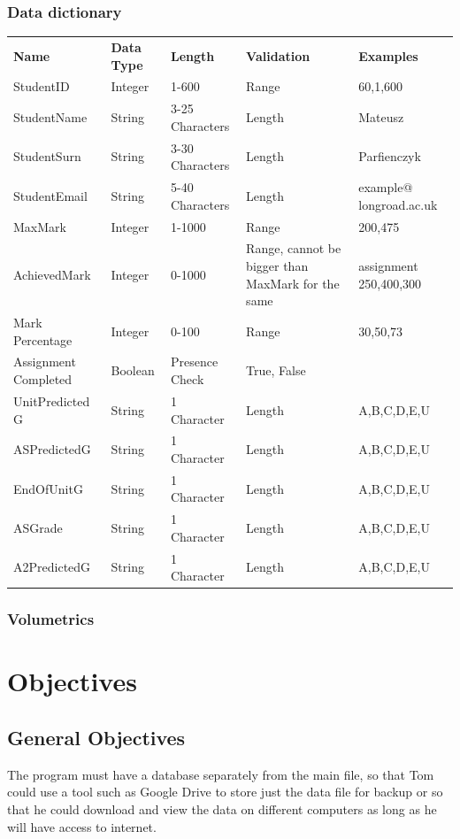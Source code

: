 \subsubsection{Data dictionary}
\begin{center}
    \begin{tabular}{|p{2cm}|p{2cm}|p{2cm}|p{2cm}|p{2cm}}
        \hline
        \textbf{Name} & \textbf{Data Type} & \textbf{Length} &  \textbf{Validation} & \textbf{Examples} \\
StudentID & Integer & 1-600 & Range & 60,1,600 \\
\hline
StudentName & String & 3-25 Characters & Length & Mateusz \\
\hline
StudentSurn & String & 3-30 Characters & Length & Parfienczyk \\
\hline
StudentEmail & String & 5-40 Characters & Length & example@ longroad.ac.uk \\
\hline
MaxMark & Integer & 1-1000 & Range & 200,475 \\
\hline
AchievedMark & Integer & 0-1000 & Range, cannot be bigger than MaxMark for the same & assignment 250,400,300 \\
\hline
Mark Percentage & Integer & 0-100 & Range & 30,50,73 \\
\hline
Assignment Completed & Boolean & Presence Check & True, False \\
\hline
UnitPredicted G & String & 1 Character & Length & A,B,C,D,E,U \\
\hline
ASPredictedG & String & 1 Character & Length & A,B,C,D,E,U \\
\hline
EndOfUnitG & String & 1 Character & Length & A,B,C,D,E,U \\
ASGrade & String & 1 Character & Length & A,B,C,D,E,U \\
\hline
A2PredictedG & String & 1 Character & Length & A,B,C,D,E,U \\
\hline
\end{tabular}
\end{center}


\subsubsection{Volumetrics}

\section{Objectives}

\subsection{General Objectives}
The program must have a database separately from the main file, so that Tom could use a tool such as Google Drive to store just the data file for backup or so that he could download and view the data on different computers as long as he will have access to internet.

